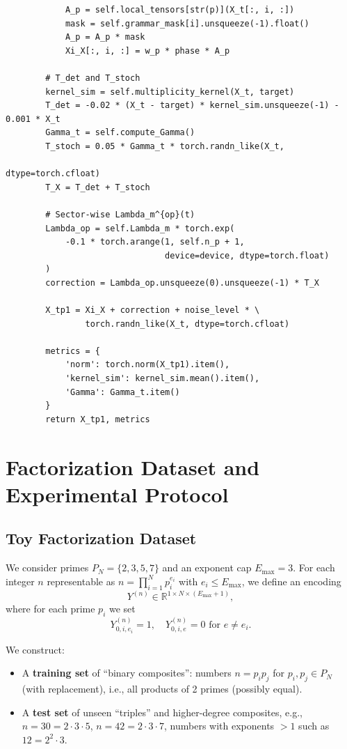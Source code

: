 \documentclass[11pt]{article}
\begin{document}
\begin{verbatim}
            A_p = self.local_tensors[str(p)](X_t[:, i, :])
            mask = self.grammar_mask[i].unsqueeze(-1).float()
            A_p = A_p * mask
            Xi_X[:, i, :] = w_p * phase * A_p

        # T_det and T_stoch
        kernel_sim = self.multiplicity_kernel(X_t, target)
        T_det = -0.02 * (X_t - target) * kernel_sim.unsqueeze(-1) - 0.001 * X_t
        Gamma_t = self.compute_Gamma()
        T_stoch = 0.05 * Gamma_t * torch.randn_like(X_t,
                                                    dtype=torch.cfloat)
        T_X = T_det + T_stoch

        # Sector-wise Lambda_m^{op}(t)
        Lambda_op = self.Lambda_m * torch.exp(
            -0.1 * torch.arange(1, self.n_p + 1,
                                device=device, dtype=torch.float)
        )
        correction = Lambda_op.unsqueeze(0).unsqueeze(-1) * T_X

        X_tp1 = Xi_X + correction + noise_level * \
                torch.randn_like(X_t, dtype=torch.cfloat)

        metrics = {
            'norm': torch.norm(X_tp1).item(),
            'kernel_sim': kernel_sim.mean().item(),
            'Gamma': Gamma_t.item()
        }
        return X_tp1, metrics
\end{verbatim}

\section{Factorization Dataset and Experimental Protocol}

\subsection{Toy Factorization Dataset}

We consider primes $P_N=\{2,3,5,7\}$ and an exponent cap $E_{\max}=3$. For each integer $n$ representable as $n=\prod_{i=1}^N p_i^{e_i}$ with $e_i\le E_{\max}$, we define an encoding
\[
Y^{(n)}\in\mathbb{R}^{1\times N\times (E_{\max}+1)},
\]
where for each prime $p_i$ we set
\[
Y^{(n)}_{0,i,e_i} = 1, \quad Y^{(n)}_{0,i,e} = 0 \text{ for } e\neq e_i.
\]

We construct:
\begin{itemize}[leftmargin=1.5em]
\item A \textbf{training set} of ``binary composites'': numbers $n=p_i p_j$ for $p_i,p_j\in P_N$ (with replacement), i.e., all products of 2 primes (possibly equal).
\item A \textbf{test set} of unseen ``triples'' and higher-degree composites, e.g., $n=30=2\cdot 3\cdot 5$, $n=42=2\cdot 3\cdot 7$, numbers with exponents $>1$ such as $12=2^2\cdot 3$.
\end{itemize}
\end{document}
